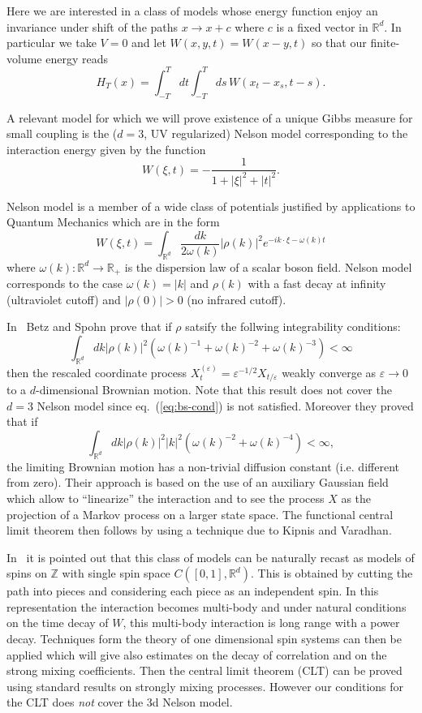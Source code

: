 \documentclass[a4paper,12pt,reqno]{amsart}
\newcommand{\eps}{\varepsilon}
\newcommand{\R}{\mathbb{R}}
\newcommand{\Z}{\mathbb{Z}}
\begin{document}
Here we are interested in a class of models whose energy function enjoy
an invariance under shift of the paths $x \to x + c$ where $c$ is a
fixed vector in $\R^d$. In particular we take $V = 0$ and let
$W(x,y,t) = W(x-y,t)$ so that our finite-volume energy reads
$$
H_T(x) =  \int_{-T}^T dt \int_{-T}^T ds\, W(x_t-x_s,t-s).
$$


A relevant model for which we will prove existence of a unique Gibbs measure for small coupling is the ($d=3$, UV regularized) Nelson model
corresponding to the interaction energy given by the function
$$
W(\xi,t) = -\frac{1}{1+|\xi|^2+|t|^2}.
$$

Nelson model is a member of a wide class of potentials justified by applications to Quantum Mechanics  which are in the form
\begin{equation}
  \label{eq:spectral}
W(\xi,t)  = \int_{\R^d} \frac{dk}{2\omega(k)} |\rho(k)|^2 e^{- i k\cdot \xi - \omega(k) t}
\end{equation}
where $\omega(k) : \R^d \to \R_+$ is the dispersion law of a scalar boson field. Nelson model corresponds to the case $\omega(k) = |k|$ and $\rho(k)$ with a fast decay at infinity (ultraviolet  cutoff) and $|\rho(0)| > 0$ (no infrared cutoff).

In~\cite{BS03} Betz and Spohn prove that if $\rho$ satsify the follwing integrability conditions:
\begin{equation}
  \label{eq:bs-cond}
\int_{\R^d} dk |\rho(k)|^2 
 \left( \omega(k)^{-1} + \omega(k)^{-2} + \omega(k)^{-3}\right) < \infty  
\end{equation}
then
 the rescaled coordinate process $X^{(\eps)}_t =
\eps^{-1/2} X_{t/\eps}$ weakly converge as $\eps\to 0$ to a
$d$-dimensional Brownian motion. Note that this result does not cover the $d=3$ Nelson model since eq.~(\ref{eq:bs-cond}) is not satisfied. Moreover they proved that if
$$
\int_{\R^d} dk |\rho(k)|^2 |k|^2
 \left(  \omega(k)^{-2} + \omega(k)^{-4}\right) < \infty,
$$
the limiting Brownian motion has a non-trivial diffusion constant (i.e. different from zero). Their approach is based on the use of
an auxiliary Gaussian field which allow to ``linearize'' the
interaction and to see the process $X$ as the projection of a Markov
process on a larger state space. The functional central limit theorem
 then follows by using a technique due to  Kipnis and Varadhan.

In~\cite{Spohn87} it is pointed out that this class of
models can be naturally recast as models of spins on $\Z$ with single
spin space $C([0,1],\R^d)$. This is obtained by cutting the path into
pieces and considering each piece as an independent spin. In this
representation the interaction becomes multi-body and under natural
conditions on the time decay of $W$, this multi-body interaction is
long range with a power decay. Techniques form the theory of one
dimensional spin systems can then be applied which will give also estimates
on the decay of correlation and on the strong mixing coefficients. 
Then the central limit theorem (CLT)
can be proved using standard results on strongly mixing processes.
However our conditions for the CLT does \emph{not} cover the 3d Nelson model.
\end{document}
